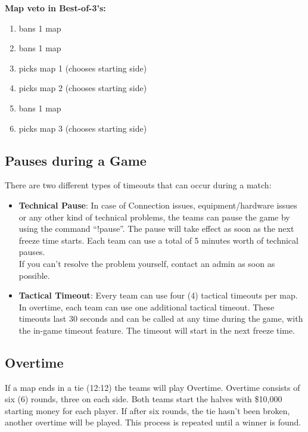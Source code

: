\documentclass{article}
\begin{document}
\textbf{Map veto in Best-of-3's:}
\begin{enumerate}
    \item \TeamA bans 1 map
    \item \TeamB bans 1 map
    \item \TeamA picks map 1 (\TeamB chooses starting side)
    \item \TeamB picks map 2 (\TeamA chooses starting side)
    \item \TeamB bans 1 map
    \item \TeamA picks map 3 (\TeamB chooses starting side)
\end{enumerate}

\subsection{Pauses during a Game}
There are two different types of timeouts that can occur during a match:
\begin{itemize}
    \item \textbf{Technical Pause}: In case of Connection issues, equipment/hardware issues or any other kind of technical problems, the teams can pause the game by using the command “!pause”. The pause will take effect as soon as the next freeze time starts. Each team can use a total of 5 minutes worth of technical pauses.\\
    If you can't resolve the problem yourself, contact an admin as soon as possible.
    \item \textbf{Tactical Timeout}: Every team can use four (4) tactical timeouts per map. In overtime, each team can use one additional tactical timeout. These timeouts last 30 seconds and can be called at any time during the game, with the in-game timeout feature. The timeout will start in the next freeze time.

\end{itemize}

\subsection{Overtime}
If a map ends in a tie (12:12) the teams will play Overtime. Overtime consists of six (6) rounds, three on each side. Both teams
start the halves with \$10,000 starting money for each player. If after six rounds, the tie hasn't been broken, another overtime will be played. This process is repeated until a winner is found. 
\end{document}
